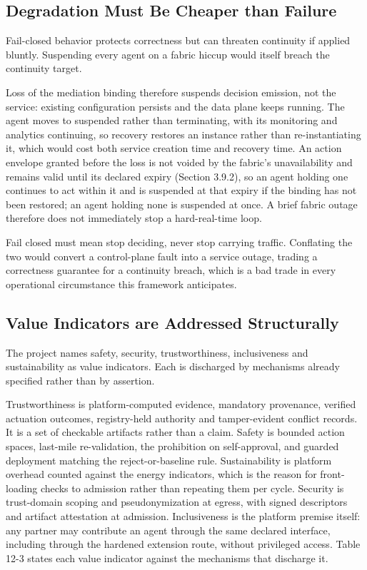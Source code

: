 \hypertarget{degradation-must-be-cheaper-than-failure}{%
\subsection{Degradation Must Be Cheaper than Failure}\label{degradation-must-be-cheaper-than-failure}}

Fail-closed behavior protects correctness but can threaten continuity if
applied bluntly. Suspending every agent on a fabric hiccup would itself
breach the continuity target.

Loss of the mediation binding therefore suspends decision emission, not
the service: existing configuration persists and the data plane keeps
running. The agent moves to suspended rather than terminating, with its
monitoring and analytics continuing, so recovery restores an instance
rather than re-instantiating it, which would cost both service creation
time and recovery time. An action envelope granted before the loss is
not voided by the fabric's unavailability and remains valid until its
declared expiry (Section 3.9.2), so an agent holding one continues to
act within it and is suspended at that expiry if the binding has not
been restored; an agent holding none is suspended at once. A brief
fabric outage therefore does not immediately stop a hard-real-time loop.

Fail closed must mean stop deciding, never stop carrying traffic.
Conflating the two would convert a control-plane fault into a service
outage, trading a correctness guarantee for a continuity breach, which
is a bad trade in every operational circumstance this framework
anticipates.

\hypertarget{value-indicators-are-addressed-structurally}{%
\subsection{Value Indicators are Addressed Structurally}\label{value-indicators-are-addressed-structurally}}

The project names safety, security, trustworthiness, inclusiveness and
sustainability as value indicators. Each is discharged by mechanisms
already specified rather than by assertion.

Trustworthiness is platform-computed evidence, mandatory provenance,
verified actuation outcomes, registry-held authority and tamper-evident
conflict records. It is a set of checkable artifacts rather than a
claim. Safety is bounded action spaces, last-mile re-validation, the
prohibition on self-approval, and guarded deployment matching the
reject-or-baseline rule. Sustainability is platform overhead counted
against the energy indicators, which is the reason for front-loading
checks to admission rather than repeating them per cycle. Security is
trust-domain scoping and pseudonymization at egress, with signed
descriptors and artifact attestation at admission. Inclusiveness is the
platform premise itself: any partner may contribute an agent through the
same declared interface, including through the hardened extension route,
without privileged access. Table 12-3 states each value indicator
against the mechanisms that discharge it.

